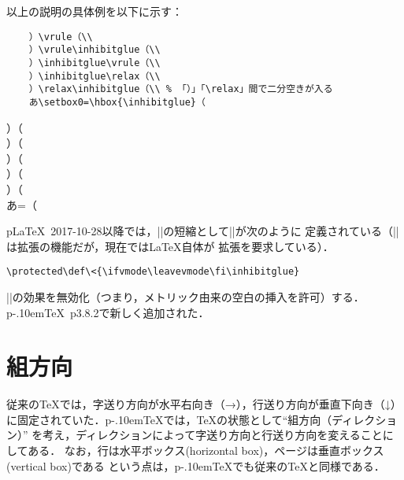 \documentclass[a4paper,11pt,nomag]{jsarticle}
\def\pTeX{p\kern-.10em\TeX}
\begin{document}
\begin{dangerous}
  以上の説明の具体例を以下に示す：

  \medskip\noindent
  \begin{minipage}[t]{.8\linewidth}
  \begin{verbatim}
    ）\vrule（\\
    ）\vrule\inhibitglue（\\
    ）\inhibitglue\vrule（\\
    ）\inhibitglue\relax（\\
    ）\relax\inhibitglue（\\ % 「）」「\relax」間で二分空きが入る
    あ\setbox0=\hbox{\inhibitglue}（
  \end{verbatim}
  \end{minipage}\hfill
  \begin{minipage}[t]{.1\linewidth}
    ）\vrule（\\
    ）\vrule\inhibitglue（\\
    ）\inhibitglue\vrule（\\
    ）\inhibitglue\relax（\\
    ）\relax\inhibitglue（\\
    あ=\hbox{\inhibitglue}（
  \end{minipage}
\end{dangerous}
\begin{dangerous}
  p\LaTeX~2017-10-28以降では，|\inhibitglue|の短縮として|\<|が次のように
  定義されている（|\protected|は\eTeX 拡張の機能だが，現在では\LaTeX 自体が
  \eTeX 拡張を要求している）．
\begin{verbatim}
\protected\def\<{\ifvmode\leavevmode\fi\inhibitglue}
\end{verbatim}
\end{dangerous}
\begin{cslist}
\csitem[\.{disinhibitglue}]
  |\inhibitglue|の効果を無効化（つまり，メトリック由来の空白の挿入を許可）する．
  \pTeX~p3.8.2で新しく追加された．
\end{cslist}



\section{組方向}

従来の\TeX では，字送り方向が水平右向き（→），行送り方向が垂直下向き（↓）
に固定されていた．\pTeX では，\TeX の状態として“組方向（ディレクション）”
を考え，ディレクションによって字送り方向と行送り方向を変えることにしてある．
なお，行は水平ボックス(horizontal box)，ページは垂直ボックス(vertical box)である
という点は，\pTeX でも従来の\TeX と同様である．
\end{document}
